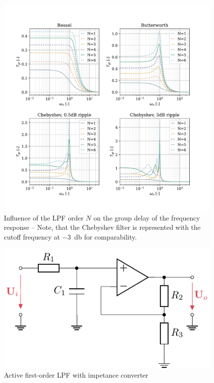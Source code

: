 \begin{figure}[!htb]
    \centering
    \includegraphics[scale=0.72]{figures/electronics/lowpass/lp_filter_grd}
    \caption[Influence of the \ac{LPF} order $N$ on the group delay of the frequency response]{Influence of the \ac{LPF} order $N$ on the group delay of the frequency response -- Note, that the Chebyshev filter is represented with the cutoff frequency at \SI{-3}{\decibel} for comparability.}
    \label{fig:lp_filter_grd}
\end{figure}

\begin{figure}[!htb]
    \centering
    \includegraphics[scale=1]{figures/electronics/lowpass/lp_active_1ord_imp_conv/lp_active_1ord_imp_conv}
    \caption[Active first-order \ac{LPF} with impetance converter]{Active first-order \ac{LPF} with impetance converter}
    \label{fig:lp_active_1ord_imp_conv}
\end{figure}

